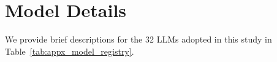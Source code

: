 \section{Model Details}
\label{appx_model_details}
We provide brief descriptions for the 32 LLMs adopted in this study in Table~\ref{tab:appx_model_registry}.

